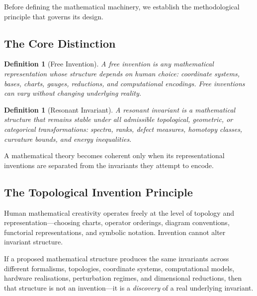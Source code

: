 \documentclass[11pt]{article}
\newtheorem{definition}[theorem]{Definition}
\begin{document}
Before defining the mathematical machinery, we establish the methodological
principle that governs its design.

\subsection{The Core Distinction}

\begin{definition}[Free Invention]\label{def:free-invention}
A \emph{free invention} is any mathematical representation whose structure depends on
human choice: coordinate systems, bases, charts, gauges, reductions, and computational
encodings. Free inventions can vary without changing underlying reality.
\end{definition}

\begin{definition}[Resonant Invariant]\label{def:resonant-invariant}
A \emph{resonant invariant} is a mathematical structure that remains stable under all
admissible topological, geometric, or categorical transformations: spectra, ranks,
defect measures, homotopy classes, curvature bounds, and energy inequalities.
\end{definition}

\begin{principle}\label{princ:inv-dist}
A mathematical theory becomes coherent only when its representational inventions are
separated from the invariants they attempt to encode.
\end{principle}

\subsection{The Topological Invention Principle}

\begin{axiom}\label{ax:top-inv}
Human mathematical creativity operates freely at the level of topology and
representation---choosing charts, operator orderings, diagram conventions, functorial
representations, and symbolic notation. Invention cannot alter invariant structure.
\end{axiom}

\begin{axiom}\label{ax:inv-rigid}
If a proposed mathematical structure produces the same invariants across different
formalisms, topologies, coordinate systems, computational models, hardware realisations,
perturbation regimes, and dimensional reductions, then that structure is not an
invention---it is a \emph{discovery} of a real underlying invariant.
\end{axiom}
\end{document}
